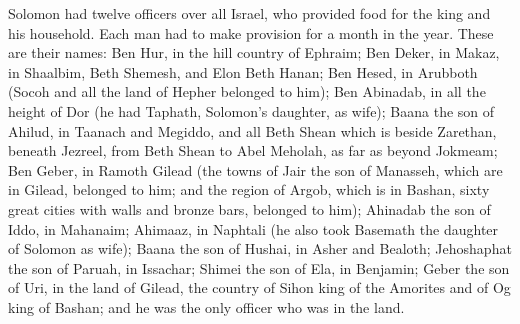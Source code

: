  Solomon had twelve officers over all Israel, who provided
food for the king and his household. Each man had to make provision for
a month in the year.  These are their names: Ben Hur, in
the hill country of Ephraim;  Ben Deker, in Makaz, in
Shaalbim, Beth Shemesh, and Elon Beth Hanan;  Ben Hesed,
in Arubboth (Socoh and all the land of Hepher belonged to him);
 Ben Abinadab, in all the height of Dor (he had Taphath,
Solomon's daughter, as wife);  Baana the son of Ahilud,
in Taanach and Megiddo, and all Beth Shean which is beside Zarethan,
beneath Jezreel, from Beth Shean to Abel Meholah, as far as beyond
Jokmeam;  Ben Geber, in Ramoth Gilead (the towns of Jair
the son of Manasseh, which are in Gilead, belonged to him; and the
region of Argob, which is in Bashan, sixty great cities with walls and
bronze bars, belonged to him);  Ahinadab the son of Iddo,
in Mahanaim;  Ahimaaz, in Naphtali (he also took Basemath
the daughter of Solomon as wife);  Baana the son of
Hushai, in Asher and Bealoth;  Jehoshaphat the son of
Paruah, in Issachar;  Shimei the son of Ela, in Benjamin;
 Geber the son of Uri, in the land of Gilead, the country
of Sihon king of the Amorites and of Og king of Bashan; and he was the
only officer who was in the land.


